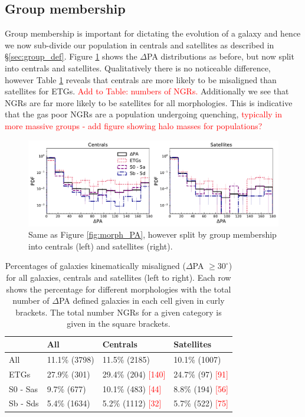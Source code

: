 \documentclass[fleqn,usenatbib]{mnras}
\newcommand{\red}[1]{{\textcolor{red}{#1}}}
\begin{document}
\subsection{Group membership}
Group membership is important for dictating the evolution of a galaxy and hence we now sub-divide our population in centrals and satellites as described in \S\ref{sec:group_def}. Figure \ref{fig:group_morph_PA} shows the $\Delta$PA distributions as before, but now split into centrals and satellites. Qualitatively there is no noticeable difference, however Table \ref{tab:mega_table} reveals that centrals are more likely to be misaligned than satellites for ETGs. \red{Add to Table: numbers of NGRs.} Additionally we see that NGRs are far more likely to be satellites for all morphologies. This is indicative that the gas poor NGRs are a population undergoing quenching, \red{typically in more massive groups - add figure showing halo masses for populations?}

\begin{figure}
	\includegraphics[width=\linewidth]{cen_sat/delPA_morph_lim.pdf}
    \caption{Same as Figure \ref{fig:morph_PA}, however split by group membership into centrals (left) and satellites (right).}
    \label{fig:group_morph_PA}
\end{figure}

\begin{table}
\begin{tabular}{llll}
\hline
          &           All &      Centrals &    Satellites \\
\hline
      All &  11.1\% (3798) &  11.5\% (2185) &  10.1\% (1007) \\
     ETGs &   27.9\% (301) &   29.4\% (204) \red{[140]} & 24.7\% (97) \red{[91]} \\
 S0 - Sas &    9.7\% (677) &   10.1\% (483) \red{[44]} &    8.8\% (194) \red{[56]} \\
 Sb - Sds &   5.4\% (1634) &   5.2\% (1112) \red{[32]} & 5.7\% (522) \red{[75]} \\
\end{tabular}
\caption{Percentages of galaxies kinematically misaligned ($\Delta$PA $\geq 30^{\circ}$) for all galaxies, centrals and satellites (left to right). Each row shows the percentage for different morphologies with the total number of $\Delta$PA defined galaxies in each cell given in curly brackets. The total number NGRs for a given category is given in the square brackets.}
\label{tab:mega_table}
\end{table}
\end{document}
